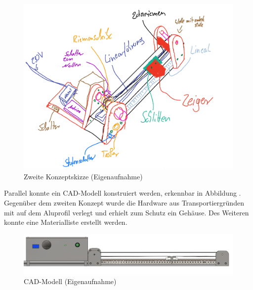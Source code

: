 \begin{figure}[H]
	\begin{center}
		\includegraphics[width=\textwidth]{Images/Konzeptskizze2.png}
		\caption{Zweite Konzeptskizze (Eigenaufnahme)} \label{ZweiteKonzeptskizze}
	\end{center}
\end{figure}

Parallel konnte ein CAD-Modell konstruiert werden, erkennbar in Abbildung . Gegenüber dem zweiten Konzept wurde die Hardware aus Transportiergründen mit auf dem Aluprofil verlegt und erhielt zum Schutz ein Gehäuse. Des Weiteren konnte eine Materialliste erstellt werden. 

\begin{figure}[H]
	\begin{center}
		\includegraphics[width=\textwidth]{Images/Konstruktion1.png}
		\caption{CAD-Modell (Eigenaufnahme)} \label{CADMOD}
	\end{center}
\end{figure} 

